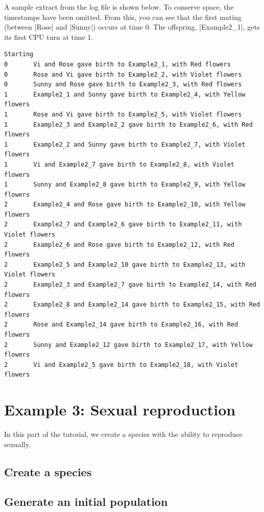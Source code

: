 \documentclass[a4paper,10pt]{report}
\begin{document}
A sample extract from the log file is shown below.
To conserve space, the timestamps have been omitted.
From this, you can see that the first mating (between |Rose| and |Sunny|)
occurs at time 0.
The offspring, |Example2_1|, gets its first CPU turn at time 1.

\begin{verbatim}
Starting
0       Vi and Rose gave birth to Example2_1, with Red flowers
0       Rose and Vi gave birth to Example2_2, with Violet flowers
0       Sunny and Rose gave birth to Example2_3, with Red flowers
1       Example2_1 and Sunny gave birth to Example2_4, with Yellow flowers
1       Rose and Vi gave birth to Example2_5, with Violet flowers
1       Example2_3 and Example2_2 gave birth to Example2_6, with Red flowers
1       Example2_2 and Sunny gave birth to Example2_7, with Violet flowers
1       Vi and Example2_7 gave birth to Example2_8, with Violet flowers
1       Sunny and Example2_8 gave birth to Example2_9, with Yellow flowers
2       Example2_4 and Rose gave birth to Example2_10, with Yellow flowers
2       Example2_7 and Example2_6 gave birth to Example2_11, with Violet flowers
2       Example2_6 and Rose gave birth to Example2_12, with Red flowers
2       Example2_5 and Example2_10 gave birth to Example2_13, with Violet flowers
2       Example2_3 and Example2_7 gave birth to Example2_14, with Red flowers
2       Example2_8 and Example2_14 gave birth to Example2_15, with Red flowers
2       Rose and Example2_14 gave birth to Example2_16, with Red flowers
2       Sunny and Example2_12 gave birth to Example2_17, with Yellow flowers
2       Vi and Example2_5 gave birth to Example2_18, with Violet flowers
\end{verbatim}

\chapter{Example 3: Sexual reproduction}
\label{sec:bug}

In this part of the tutorial, we create a species with the
ability to reproduce sexually.

\section{Create a species}
\label{sec:species3}



\section{Generate an initial population}
\label{sec:pop3}
\end{document}
